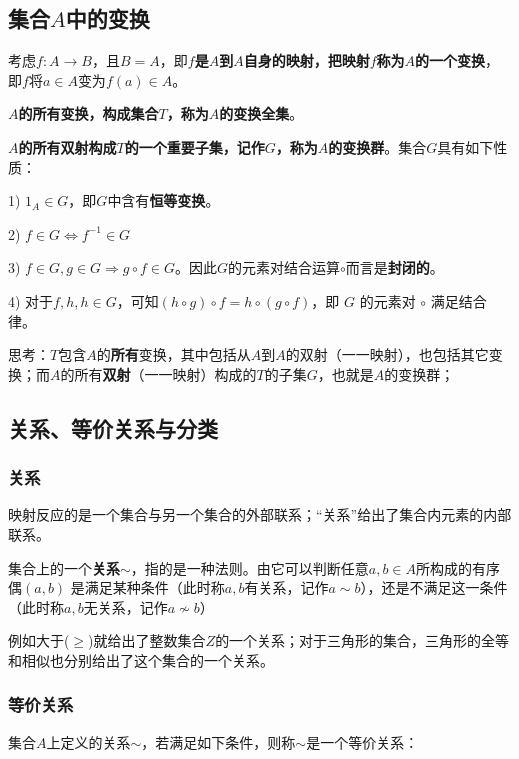 \documentclass[12pt]{article}
\begin{document}
\subsection{集合$A$中的变换}
考虑$f: A \rightarrow B$，且$B = A$，即\textbf{$f$是$A$到$A$自身的映射，把映射$f$称为$A$的一个变换}，即$f$将$a \in A$变为$f(a) \in A$。

\textbf{$A$的所有变换，构成集合$T$，称为$A$的变换全集}。

\textbf{$A$的所有双射构成$T$的一个重要子集，记作$G$，称为$A$的变换群}。集合$G$具有如下性质：

1) $1_A \in G$，即$G$中含有\textbf{恒等变换}。

2) $f \in G \Leftrightarrow f^{-1} \in G$

3) $f \in G, g\in G \Rightarrow g \circ f \in G$。因此$G$的元素对结合运算$\circ$而言是\textbf{封闭的}。

4) 对于$f, h, h \in G$，可知$(h \circ g) \circ f = h \circ( g \circ f)$，即 $G$ 的元素对 $\circ$ 满足结合律。

\begin{framed}
\small {
思考：$T$包含$A$的\textbf{所有}变换，其中包括从$A$到$A$的双射（一一映射），也包括其它变换；而$A$的所有\textbf{双射}（一一映射）构成的$T$的子集$G$，也就是$A$的变换群；
}
\end{framed}

\subsection{关系、等价关系与分类}
\subsubsection{关系}
映射反应的是一个集合与另一个集合的外部联系；“关系”给出了集合内元素的内部联系。

集合上的一个\textbf{关系$\sim$}，指的是一种法则。由它可以判断任意$a,b\in A$所构成的有序偶$(a,b)$ 是满足某种条件（此时称$a,b$有关系，记作$a\sim b$），还是不满足这一条件（此时称$a,b$无关系，记作$a\nsim b$）

\begin{framed}
\small {
例如大于($\ge$)就给出了整数集合$Z$的一个关系；对于三角形的集合，三角形的全等和相似也分别给出了这个集合的一个关系。
}
\end{framed}

\subsubsection{等价关系}
集合$A$上定义的关系$\sim$，若满足如下条件，则称$\sim$是一个等价关系：
\end{document}
